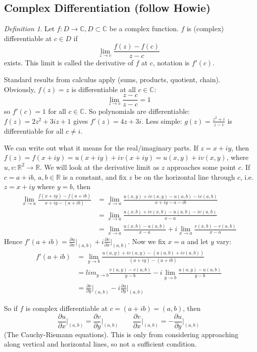 \documentclass{article}
\theoremstyle{plain}
\theoremstyle{remark}
\newtheorem{definition}{Definition}
\newcommand{\R}{{\mathbb R}}
\newcommand{\C}{{\mathbb C}}
\begin{document}
\subsection{Complex Differentiation (follow Howie)}
\begin{definition}
	Let $f \colon D \to \C, D \subset \C$ be a complex function.
	$f$ is (complex) differentiable at $c \in D$ if
	\[
		\lim_{z \to c} \frac{f(z) - f(c)}{z-c}
	\]
	exists.
	This limit is called the derivative of $f$ at $c$,
	notation is $f'(c)$.
\end{definition}

Standard results from calculus apply (sums, products, quotient, chain).
Obviously, $f(z) = z$ is differentiable at all $c \in \C$:
\[
	\lim_{z\to c} \frac{z-c}{z-c} = 1
\]
so $f'(c) = 1$ for all $c \in \C$.
So polynomials are differentiable: $f(z) = 2z^2 + 3iz + 1$
gives $f'(z) = 4z + 3i$.
Less simple: $g(z) = \frac{z^2 + i}{z-i}$ is differentiable for all $c \neq i$.

We can write out what it means for the real/imaginary parts.
If $z = x + iy$, then $f(z) = f(x+iy) = u(x+iy) + iv(x + iy)
= u(x,y) + iv(x,y)$,
where $u,v \colon \R^2 \to \R$.
We will look at the derivative limit as $z$ approaches some point $c$.
If $c = a + ib$, $a,b \in \R$ is a constant,
and fix $z$ be on the horizontal line through $c$,
i.e. $z = x + iy$ where $y = b$, then
\begin{align*}
	\lim_{x \to a} \frac{f(x+iy) - f(a + ib)}{x + iy - (a + ib)}
	&= \lim_{x \to a} \frac{u(x,y) + iv(x,y) - u(a,b) - iv(a,b)}{x+iy - a - ib}\\
	&= \lim_{x\to a} \frac{u(x,b) + iv(x,b) - u(a,b) - iv(a,b)}{x - a}\\
	&= \lim_{x \to a} \frac{u(x,b) - u(a,b)}{x-a} +
	i\lim_{x \to a} \frac{v(x,b) - v(a,b)}{x-a}
\end{align*}
Hence $f'(a+ib) = \frac{\partial u}{\partial x} \big\vert_{(a,b)}
+ i \frac{\partial v}{\partial x}\big\vert_{(a,b)}$.
Now we fix $x = a$ and let $y$ vary:
\begin{align*}
	f'(a+ib) &= \lim_{y \to b} \frac{u(a,y) + iv(a,y) - (u(a,b) + iv(a,b))}{(a+iy)-(a+ib)}\\
			 &= lim_{y \to b} \frac{v(a,y) - v(a,b)}{y-b} - i\lim_{y\to b}
			 \frac{u(a,y) - u(a,b)}{y-b}\\
			 &= \frac{\partial v}{\partial y} \bigg\vert_{(a,b)}
			 - i \frac{\partial u}{\partial y}\bigg\vert_{(a,b)}
\end{align*}

So if $f$ is complex differentiable at $c = (a+ib) = (a,b)$, then
\[
	\frac{\partial u}{\partial x}\bigg\vert_{(a,b)} = \frac{\partial v}{\partial y}\bigg\vert_{(a,b)}
	\qquad
	\frac{\partial v}{\partial x}\bigg\vert_{(a,b)} = -\frac{\partial u}{\partial y}\bigg\vert_{(a,b)}
\]
(The Cauchy-Riemann equations).
This is only from considering approaching along vertical and horizontal lines,
so not a sufficient condition.
\end{document}
